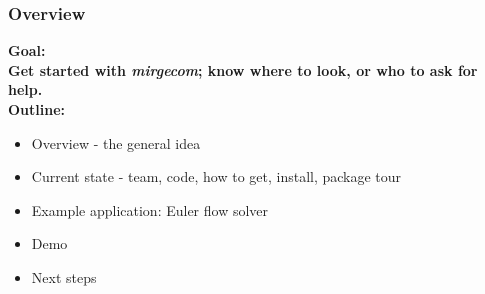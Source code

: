 \begin{frame}\frametitle{Overview}
\vspace*{0.1in}
\bfseries{\color{myOrange} Goal}:\\
Get started with \textit{mirgecom}; know where to look, or who to ask for help.\\
\vspace{0.2in}
\bfseries{\color{myOrange} Outline}:\\
\begin{multicols}{2}
\begin{itemize}
  \item Overview - the general idea
  \item Current state - team, code, how to get, install, package tour
  \item Example application: Euler flow solver
  \item Demo
  \item Next steps
\end{itemize}
\end{multicols}
\end{frame}

